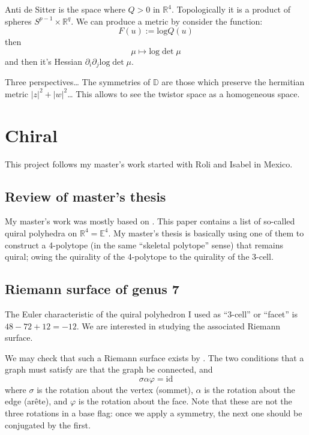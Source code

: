 Anti de Sitter is the space where $Q>0$ in $\mathbb{R}^4$. Topologically it is a
product of spheres $S^{p-1}\times \mathbb{R}^q$. We can produce a metric by
consider the function:
$$
F(u):=\text{log}Q(u)
$$
then
$$
\mu \mapsto  \text{log}\det\mu
$$
and then it's Hessian $\partial_i \partial_j \text{log}\det \mu$.

Three perspectives… The symmetries of $\mathbb{D}$ are those which preserve the
hermitian metric $|z|^2+|w|^2$… This allows to see the twistor space 
as a homogeneous space.

\section{Chiral}
\label{section-chiral}

This project follows my master's work started with Roli and Isabel in Mexico.

\subsection{Review of master's thesis}
\label{subsection-masters-thesis}

My master's work was mostly based on \cite{petcox}. This paper contains a list
of so-called quiral polyhedra on $\mathbb{R}^4=\mathbb{E}^4$. My master's thesis
is basically using one of them to construct a 4-polytope (in the same ``skeletal
polytope'' sense) that remains quiral; owing the quirality of the 4-polytope to
the quirality of the 3-cell.

\subsection{Riemann surface of genus 7}
\label{subsection-Riemann-surface-of-genus-7}

The Euler characteristic of the quiral polyhedron I used as ``3-cell'' or
``facet'' is $48-72+12=-12$. We are interested in studying the associated
Riemann surface.

We may check that such a Riemann surface exists by
\cite[Construction 1.3.20]{lando}. The two conditions that a graph must satisfy
are that the graph be connected, and 
\begin{equation}
\label{equation-sigma-alpha-phi}
\sigma\alpha\varphi=\text{id}
\end{equation}
where
$\sigma$ is the rotation about the vertex (sommet),
$\alpha$ is the rotation about the edge (arête),
and $\varphi$ is the rotation about the face. 
Note that these are not the three
rotations in a base flag: once we apply a symmetry, the next one should be
conjugated by the first.

